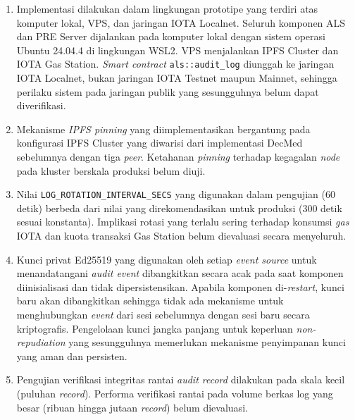 \begin{enumerate}
    \item Implementasi dilakukan dalam lingkungan prototipe yang terdiri atas komputer lokal, VPS, dan jaringan IOTA Localnet. Seluruh komponen ALS dan PRE Server dijalankan pada komputer lokal dengan sistem operasi Ubuntu 24.04.4 di lingkungan WSL2. VPS menjalankan IPFS Cluster dan IOTA Gas Station. \textit{Smart contract} \texttt{als::audit\_log} diunggah ke jaringan IOTA Localnet, bukan jaringan IOTA Testnet maupun Mainnet, sehingga perilaku sistem pada jaringan publik yang sesungguhnya belum dapat diverifikasi.
    
    \item Mekanisme \textit{IPFS pinning} yang diimplementasikan bergantung pada konfigurasi IPFS Cluster yang diwarisi dari implementasi DecMed sebelumnya dengan tiga \textit{peer}. Ketahanan \textit{pinning} terhadap kegagalan \textit{node} pada kluster berskala produksi belum diuji.
    \item Nilai \texttt{LOG\_ROTATION\_INTERVAL\_SECS} yang digunakan dalam pengujian (60 detik) berbeda dari nilai yang direkomendasikan untuk produksi (300 detik sesuai konstanta). Implikasi rotasi yang terlalu sering terhadap konsumsi \textit{gas} IOTA dan kuota transaksi Gas Station belum dievaluasi secara menyeluruh.
    
    \item Kunci privat Ed25519 yang digunakan oleh setiap \textit{event source} untuk menandatangani \textit{audit event} dibangkitkan secara acak pada saat komponen diinisialisasi dan tidak dipersistensikan. Apabila komponen di-\textit{restart}, kunci baru akan dibangkitkan sehingga tidak ada mekanisme untuk menghubungkan \textit{event} dari sesi sebelumnya dengan sesi baru secara kriptografis. Pengelolaan kunci jangka panjang untuk keperluan \textit{non-repudiation} yang sesungguhnya memerlukan mekanisme penyimpanan kunci yang aman dan persisten.
    
    \item Pengujian verifikasi integritas rantai \textit{audit record} dilakukan pada skala kecil (puluhan \textit{record}). Performa verifikasi rantai pada volume berkas log yang besar (ribuan hingga jutaan \textit{record}) belum dievaluasi.
    

\end{enumerate}
